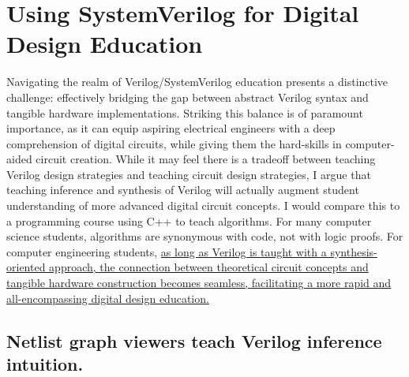 
\chapter{Using SystemVerilog for Digital Design Education}
\label{chapter:digital_design}

Navigating the realm of Verilog/SystemVerilog education presents a distinctive challenge: effectively bridging the gap between abstract Verilog syntax and tangible hardware implementations. Striking this balance is of paramount importance, as it can equip aspiring electrical engineers with a deep comprehension of digital circuits, while giving them the hard-skills in computer-aided circuit creation. While it may feel there is a tradeoff between teaching Verilog design strategies and teaching circuit design strategies, I argue that teaching inference and synthesis of Verilog will actually augment student understanding of more advanced digital circuit concepts. I would compare this to a programming course using C++ to teach algorithms. For many computer science students, algorithms are synonymous with code, not with logic proofs. For computer engineering students, \ul{as long as Verilog is taught with a synthesis-oriented approach, the connection between theoretical circuit concepts and tangible hardware construction becomes seamless, facilitating a more rapid and all-encompassing digital design education.}

\section{Netlist graph viewers teach Verilog inference intuition.}



